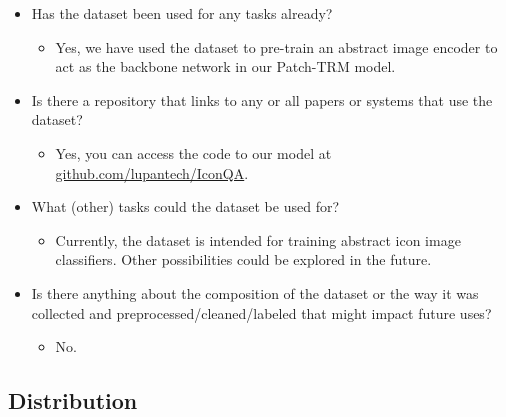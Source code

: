 \documentclass{article}
\begin{document}
\begin{itemize}
    \item Has the dataset been used for any tasks already?
    \begin{itemize}
        \item Yes, we have used the dataset to pre-train an abstract image encoder to act as the backbone network in our Patch-TRM model.
    \end{itemize}
    \item Is there a repository that links to any or all papers or systems that
use the dataset?
    \begin{itemize}
        \item Yes, you can access the code to our model at \url{github.com/lupantech/IconQA}.
    \end{itemize}
    \item What (other) tasks could the dataset be used for?
    \begin{itemize}
        \item Currently, the dataset is intended for training abstract icon image classifiers. Other possibilities could be explored in the future.
    \end{itemize}
    \item Is there anything about the composition of the dataset or the way it was collected and preprocessed/cleaned/labeled that might impact future uses?
    \begin{itemize}
        \item No.
    \end{itemize}
    
\end{itemize}

\subsection{Distribution}
\end{document}
